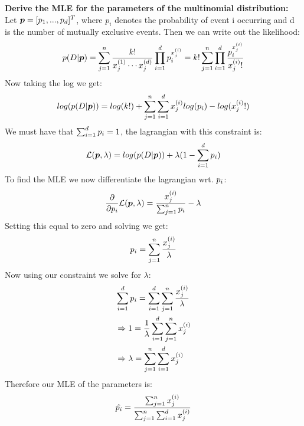 \begin{appendices}
\begin{question}
        \textbf{Derive the MLE for the parameters of the multinomial distribution:} \\
        Let $\bm{p} = [p_{1},...,p_{d}]^{T}$, where $p_{i}$ denotes the probability of event i occurring and d is the number of mutually exclusive events. Then we can write out the likelihood: 
        \begin{equation}
            p(D| \bm{p}) = \sum_{j=1}^{n} \frac{k!}{x_{j}^{(1)} \cdots x_{j}^{(d)}} \prod_{i=1}^{d} p_{i}^{x_{j}^{(i)}} = k! \sum_{j=1}^{n} \prod_{i=1}^{d} \frac{p_{i}^{x_{j}^{(i)}}}{x_{j}^{(i)} !}
        \end{equation}
        Now taking the log we get:
        \begin{equation}
            log(p(D|\bm{p})) = log(k!) + \sum_{j=1}^{n} \sum_{i=1}^{d} x_{j}^{(i)} log(p_{i}) - log(x_{j}^{(i)} !)
        \end{equation}
        We must have that $\sum_{i=1}^{d} p_{i} = 1$, the lagrangian with this constraint is:
        \begin{equation}
            \mathcal{L}(\bm{p},\lambda) = log(p(D|\bm{p})) + \lambda(1- \sum_{i=1}^{d} p_{i})
        \end{equation}
        To find the MLE we now differentiate the lagrangian wrt. $p_{i}$:
        \begin{equation}
            \frac{\partial}{\partial p_{i}} \mathcal{L}(\bm{p},\lambda) = \frac{x_{j}^{(i)}}{\sum_{j=1}^{n} p_{i}} - \lambda
        \end{equation}
        Setting this equal to zero and solving we get:
        \begin{equation}
            p_{i} = \sum_{j=1}^{n} \frac{ x_{j}^{(i)} }{\lambda} 
        \end{equation}
        Now using our constraint we solve for $\lambda$:
        \begin{align}
            &{} \sum_{i=1}^{d} p_{i} = \sum_{i=1}^{d} \sum_{j=1}^{n} \frac{x_{j}^{(i)}}{\lambda} \\
            & \Rightarrow 1 = \frac{1}{\lambda} \sum_{i=1}^{d} \sum_{j=1}^{n} x_{j}^{(i)} \\ 
            & \Rightarrow \lambda = \sum_{j=1}^{n} \sum_{i=1}^{d} x_{j}^{(i)}
        \end{align}
        Therefore our MLE of the parameters is:
        \begin{equation}
            \hat{p_{i}} = \frac{\sum_{j=1}^{n} x_{j}^{(i)}}{\sum_{j=1}^{n} \sum_{i=1}^{d} x_{j}^{(i)}} 
        \end{equation}
\end{question}


\end{appendices}
